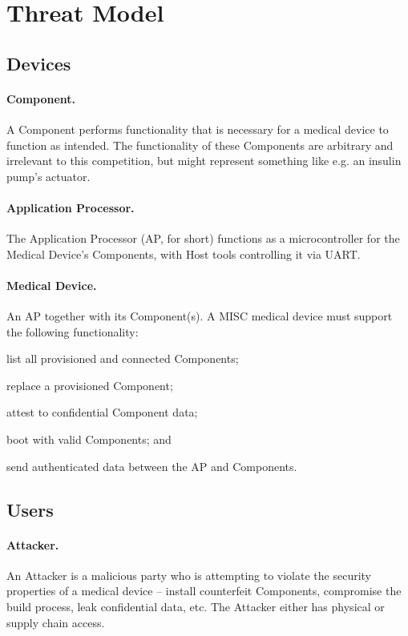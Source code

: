 \section{Threat Model}
\label{sec:threat-model}

\subsection{Devices}

\paragraph{Component.} A Component performs functionality that is necessary for a medical device to function as intended. The functionality of these Components are arbitrary and irrelevant to this competition, but might represent something like e.g. an insulin pump's actuator.

\paragraph{Application Processor.} The Application Processor (AP, for short) functions as a microcontroller for the Medical Device's Components, with Host tools controlling it via UART.

\paragraph{Medical Device.} An AP together with its Component(s). A MISC medical device must support the following functionality:
\begin{enumerate*}[label={(\arabic*)}]
    \item list all provisioned and connected Components;
    \item replace a provisioned Component;
    \item attest to confidential Component data;
    \item boot with valid Components; and
    \item send authenticated data between the AP and Components.%
\end{enumerate*}

\subsection{Users}

\paragraph{Attacker.} An Attacker is a malicious party who is attempting to violate the security properties of a medical device -- install counterfeit Components, compromise the build process, leak confidential data, etc. The Attacker either has physical or supply chain access.

